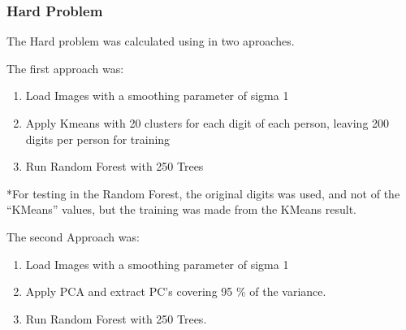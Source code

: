 \documentclass[report]{subfiles}
\begin{document}
\subsubsection{Hard Problem}
\label{sec:implRF:hardProblem}
The Hard problem was calculated using in two aproaches.

The first approach was:
\begin{enumerate}
\item Load Images with a smoothing parameter of sigma 1
\item Apply Kmeans with 20 clusters for each digit of each person, leaving 200 digits per person for training
\item Run Random Forest with 250 Trees
\end{enumerate}

*For testing in the Random Forest, the original digits was used, and not of the ``KMeans'' values, but the training was made from the KMeans result.  

The second Approach was:
\begin{enumerate}
\item Load Images with a smoothing parameter of sigma 1
\item Apply PCA and extract PC's covering 95 \% of the variance. 
\item Run Random Forest with 250 Trees.
\end{enumerate}
\end{document}
